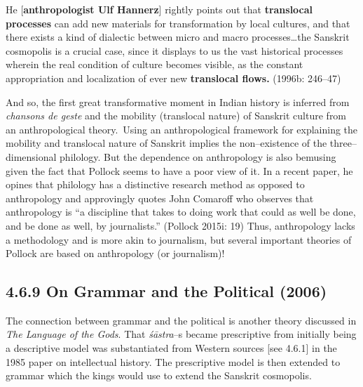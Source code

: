 \begin{myquote}
He [\textbf{anthropologist Ulf Hannerz}] rightly points out that \textbf{translocal processes} can add new materials for transformation by local cultures, and that there exists a kind of dialectic between micro and macro processes…the Sanskrit cosmopolis is a crucial case, since it displays to us the vast historical processes wherein the real condition of culture becomes visible, as the constant appropriation and localization of ever new \textbf{translocal flows.} (1996b: 246–47)
\end{myquote}

\newpage

And so, the first great transformative moment in Indian history is inferred from\textit{ chansons de geste} and the mobility (translocal nature) of Sanskrit culture from an anthropological theory.~Using an anthropological framework for explaining the mobility and translocal nature of Sanskrit implies the non–existence of the three–dimensional philology. But the dependence on anthropology is also bemusing given the fact that Pollock seems to have a poor view of it. In a recent paper, he opines that philology has a distinctive research method as opposed to anthropology and approvingly quotes John Comaroff who observes that anthropology is “a discipline that takes to doing work that could as well be done, and be done as well, by journalists.” (Pollock 2015i: 19) Thus, anthropology lacks a methodology and is more akin to journalism, but several important theories of Pollock are based on anthropology (or journalism)!


\vspace{-.3cm}

\subsection*{4.6.9 On Grammar and the Political (2006)}

\vspace{-.2cm}

The connection between grammar and the political is another theory discussed in \textit{The Language of the Gods}. That \textit{śāstra}–s became prescriptive from initially being a descriptive model was substantiated from Western sources [see 4.6.1] in the 1985 paper on intellectual history. The prescriptive model is then extended to grammar which the kings would use to extend the Sanskrit cosmopolis.

